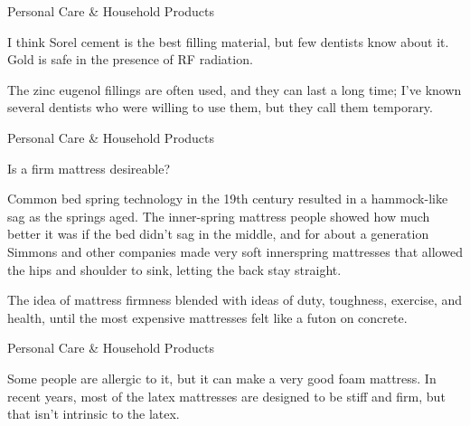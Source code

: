 \documentclass[11pt,oneside,openany,extrafontsizes]{memoir}
\begin{document}
\begin{standalonequote}{Personal Care \& Household Products}

    \begin{answer}
        I think Sorel cement is the best filling material, but few dentists know about it. Gold is safe in the presence of RF radiation.

		The zinc eugenol fillings are often used, and they can last a long time; I've known several dentists who were willing to use them, but they call them temporary.
    \end{answer}
\end{standalonequote}

\begin{qaexchange}{Personal Care \& Household Products}

    \begin{question}
        Is a firm mattress desireable?
    \end{question}

    \begin{answer}
      Common bed spring technology in the 19th century resulted in a hammock-like sag as the springs aged. The inner-spring mattress people showed how much better it was if the bed didn't sag in the middle, and for about a generation Simmons and other companies made very soft innerspring mattresses that allowed the hips and shoulder to sink, letting the back stay straight.
	  
	  The idea of mattress firmness blended with ideas of duty, toughness, exercise, and health, until the most expensive mattresses felt like a futon on concrete.
    \end{answer}
\end{qaexchange}

\begin{standalonequote}{Personal Care \& Household Products}

    \begin{answer}
      Some people are allergic to it, but it can make a very good foam mattress. In recent years, most of the latex mattresses are designed to be stiff and firm, but that isn't intrinsic to the latex.
    \end{answer}
\end{standalonequote}
\end{document}
